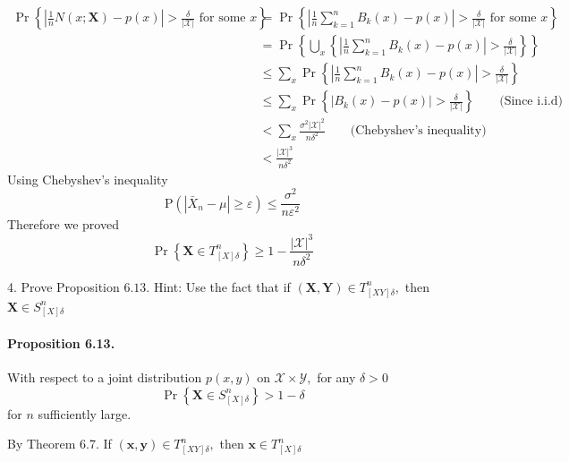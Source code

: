 \documentclass[8pt]{article}
\begin{document}
$$
\begin{aligned}
	\operatorname{Pr}\left\{\left|\frac{1}{n} N(x ; \mathbf{X})-p(x)\right|>\frac{\delta}{|\mathcal{X}|} \text { for some } x\right\} 
	&=\operatorname{Pr}\left\{\left|\frac{1}{n} \sum_{k=1}^{n} B_{k}(x)-p(x)\right|>\frac{\delta}{|\mathcal{X}|} \text { for some } x\right\} \\
	&=\operatorname{Pr}\left\{\bigcup_{x}\left\{\left|\frac{1}{n} \sum_{k=1}^{n} B_{k}(x)-p(x)\right|>\frac{\delta}{|\mathcal{X}|}\right\}\right\} \\
	&\leq \sum_{x} \operatorname{Pr}\left\{\left|\frac{1}{n} \sum_{k=1}^{n} B_{k}(x)-p(x)\right|>\frac{\delta}{|\mathcal{X}|}\right\} \\
	&\leq \sum_{x} \operatorname{Pr}\left\{\left| B_{k}(x)-p(x)\right|>\frac{\delta}{|\mathcal{X}|}\right\} \qquad \text{(Since i.i.d)}\\
	&<\sum_{x} \frac{\sigma^{2}   |\mathcal{X}|^2 }{n \delta^{2}}  \qquad \text{(Chebyshev's inequality)}\\
	&< \frac{|\mathcal{X}|^{3}}{n \delta^{2}}
\end{aligned}
$$
Using Chebyshev's inequality
$$
\mathrm{P}\left(\left|\bar{X}_{n}-\mu\right| \geq \varepsilon\right) \leq \frac{\sigma^{2}}{n \varepsilon^{2}}
$$
Therefore we proved
$$
\operatorname{Pr}\left\{\mathbf{X} \in T_{[X] \delta}^{n}\right\} \geq 1-\frac{|\mathcal{X}|^{3}}{n \delta^{2}}
$$
\vspace{10pt}

4. Prove Proposition $6.13 .$ Hint: Use the fact that if $(\mathbf{X}, \mathbf{Y}) \in T_{[X Y] \delta}^{n},$ then $\mathbf{X} \in S_{[X] \delta}^{n}$


\paragraph{Proposition 6.13.} With respect to a joint distribution $p(x, y)$ on $\mathcal{X} \times \mathcal{Y},$ for any $\delta>0$
$$
\operatorname{Pr}\left\{\mathbf{X} \in S_{[X] \delta}^{n}\right\}>1-\delta
$$
for $n$ sufficiently large.

By Theorem 6.7. If $(\mathbf{x}, \mathbf{y}) \in T_{[X Y] \delta}^{n},$ then $\mathbf{x} \in T_{[X] \delta}^{n}$
\end{document}
